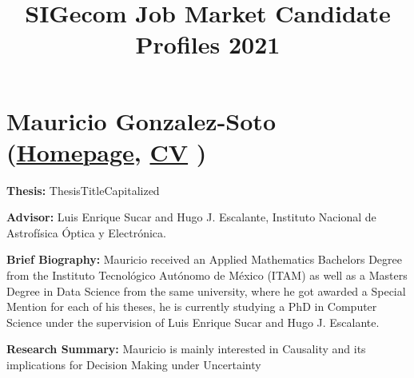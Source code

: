 \documentclass[acmsigecom]{acmtrans2m_nocategories}
\title[Job Market Candidate Profiles 2021]{SIGecom Job Market Candidate Profiles 2021}
\begin{document}
            
\maketitle
 
\tableofcontents
\newpage

\section[Mauricio Gonzalez-Soto\\ 
{\small keyword1, keyword2, keyword3, keyword4}]
{Mauricio Gonzalez-Soto 
(\href{https://www.researchgate.net/profile/Mauricio_Gonzalez-Soto}{Homepage},
\href{CandidateCV_URL}{CV}
)}

\textbf{Thesis:} ThesisTitleCapitalized

\vspace{3pt}
\noindent\textbf{Advisor:} Luis Enrique Sucar and Hugo J. Escalante, Instituto Nacional de Astrofísica Óptica y Electrónica.

\vspace{3pt}
\noindent\textbf{Brief Biography:}
Mauricio received an Applied Mathematics Bachelors Degree from the Instituto Tecnológico Autónomo de México (ITAM) as well as a Masters Degree in Data Science from the same university, where he got awarded a Special Mention for each of his theses, he is currently studying a PhD in Computer Science under the supervision of Luis Enrique Sucar and Hugo J. Escalante. 

\vspace{3pt}
\noindent\textbf{Research Summary:}
Mauricio is mainly interested in Causality and its implications for Decision Making under Uncertainty 
\end{document}
